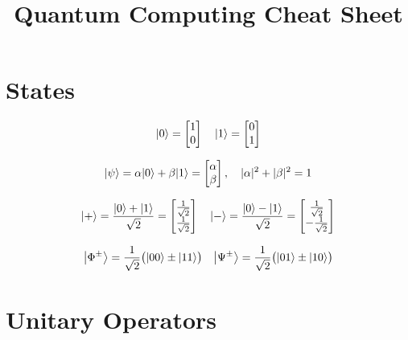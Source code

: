\documentclass[12pt]{article}
\title{\vspace{-1.2cm}Quantum Computing Cheat Sheet}
\date{}
\begin{document}
\maketitle

\vspace{-36pt}
\section{States}

\begin{equation*}
{\left\vert{0}\right\rangle} = \begin{bmatrix} 1 \\ 0 \end{bmatrix}
\quad
{\left\vert{1}\right\rangle} = \begin{bmatrix} 0 \\ 1 \end{bmatrix}
\end{equation*}

\begin{equation*}
{\left\vert{\psi}\right\rangle} = \alpha {\left\vert{0}\right\rangle} + \beta {\left\vert{1}\right\rangle} = \begin{bmatrix} \alpha \\ \beta \end{bmatrix} ,
\quad
|\alpha|^2 + |\beta|^2 = 1
\end{equation*}

\begin{equation*}
{\left\vert{+}\right\rangle} = \frac{{\left\vert{0}\right\rangle} + {\left\vert{1}\right\rangle}}{\sqrt{2}} 
= \begin{bmatrix} \frac{1}{\sqrt{2}} \\ \frac{1}{\sqrt{2}} \end{bmatrix}
\quad
{\left\vert{-}\right\rangle} = \frac{{\left\vert{0}\right\rangle} - {\left\vert{1}\right\rangle}}{\sqrt{2}}
= \begin{bmatrix} \frac{1}{\sqrt{2}} \\ -\frac{1}{\sqrt{2}} \end{bmatrix}
\end{equation*}

\begin{equation*}
{\left\vert{\Phi^\pm}\right\rangle} = \frac{1}{\sqrt{2}} \big( {\left\vert{00}\right\rangle} \pm {\left\vert{11}\right\rangle} \big)
\quad
{\left\vert{\Psi^\pm}\right\rangle} = \frac{1}{\sqrt{2}} \big( {\left\vert{01}\right\rangle} \pm {\left\vert{10}\right\rangle} \big)
\end{equation*}

\section{Unitary Operators}
\end{document}
